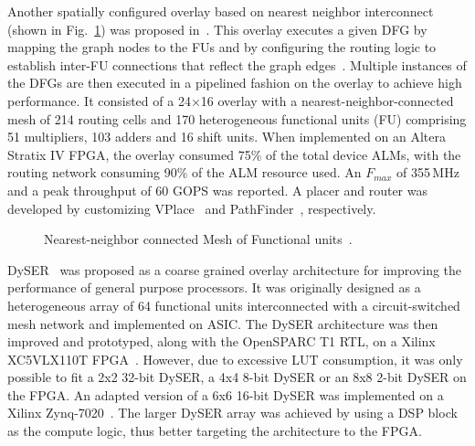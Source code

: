 Another spatially configured overlay based on nearest neighbor interconnect (shown in Fig.~\ref{meshfu}) was proposed in~\cite{capalija_high-performance_2013}.
This overlay executes a given DFG by mapping the graph nodes to the FUs and by configuring the routing logic to establish inter-FU connections that reflect the graph edges~\cite{capalija_high-performance_2013}. 
Multiple instances of the DFGs are then executed in a pipelined fashion on the overlay to achieve high performance.    
It consisted of a 24$\times$16 overlay with a nearest-neighbor-connected mesh of 214 routing cells and 170 heterogeneous functional units (FU) comprising 51 multipliers, 103 adders and 16 shift units.
When implemented on an Altera Stratix IV FPGA, the overlay consumed 75\% of the total device ALMs, with the routing network consuming 90\% of the ALM resource used.
An $F_{\mathit{max}}$ of 355\,MHz and a peak throughput of 60 GOPS was reported.
A placer and router was developed by customizing VPlace~\cite{marquardt2000timing} and PathFinder~\cite{mcmurchie1995pathfinder}, respectively.


\begin{figure}[!h]
	\centering
	\caption{Nearest-neighbor connected Mesh of Functional units~\cite{capalija_high-performance_2013}.}
	\label{meshfu}
\end{figure}




DySER~\cite{govindaraju2012dyser, govindaraju2011dynamically} was proposed as a coarse grained overlay architecture for improving the performance of general purpose processors.
It was originally designed as a heterogeneous array of 64 functional units interconnected with a circuit-switched mesh network and implemented on ASIC.
The DySER architecture was then improved and prototyped, along with the OpenSPARC T1 RTL, on a Xilinx XC5VLX110T FPGA~\cite{benson2012design}.
However, due to excessive LUT consumption, it was only possible to fit a 2x2 32-bit DySER, a 4x4 8-bit DySER or an 8x8 2-bit DySER on the FPGA.
An adapted version of a 6x6 16-bit DySER was implemented on a Xilinx Zynq-7020~\cite{heart2015-jain}. The larger DySER array was achieved by using a DSP block as the compute logic, thus better targeting the architecture to the FPGA.


